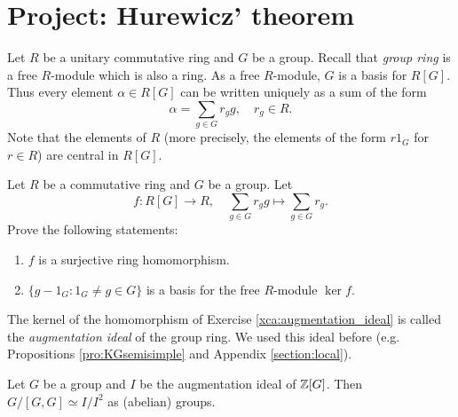 \section{Project: Hurewicz' theorem}
\label{section:Hurewicz}

Let $R$ be a unitary commutative ring and $G$ be a group. Recall that \emph{group ring} is a free $R$-module which is also a ring. As a free $R$-module, $G$ is a basis for $R[G]$. Thus every element $\alpha\in R[G]$ can be written uniquely as 
a sum of the form 
\[
\alpha=\sum_{g\in G}r_gg,\quad r_g\in R.
\]
Note that the elements of $R$ (more precisely, the elements of the form $r1_G$ for $r\in R$) are central in $R[G]$. 

\begin{exercise}
\label{xca:augmentation_ideal}
    Let $R$ be a commutative ring and $G$ be a group. Let 
    \[
    f\colon R[G] \to R,\quad 
    \sum_{g \in G} r_g g\mapsto \sum_{g \in G} r_g.
    \]
    Prove the following statements:
    \begin{enumerate}
        \item $f$ is a surjective ring
            homomorphism. 
        \item $\{g - 1_G: 1_G\ne g \in G\}$ is a    basis for the free $R$-module $\ker f$.
    \end{enumerate}
\end{exercise}

The kernel of the homomorphism of Exercise \ref{xca:augmentation_ideal} is 
called the \emph{augmentation ideal} of
the group ring. We used this ideal before (e.g. Propositions \ref{pro:KGsemisimple} and Appendix \ref{section:local}). 

\begin{theorem}[Hurewicz]
    \label{thm:Hurewicz}
    Let $G$ be a group and $I$ be the augmentation ideal of $\mathbb{Z}[G]$. 
    Then $G/[G,G]\simeq I/I^2$ as (abelian) groups. 
\end{theorem}

